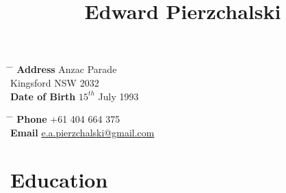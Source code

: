 \documentclass[10pt]{article} %
\begin{document}

\title{Edward Pierzchalski} %


\parbox{0.5\textwidth}{ %
\begin{tabbing} %
\hspace{3cm} \= \hspace{4cm} \= \kill %
{\bf Address}  Anzac Parade\\ %
\> Kingsford NSW 2032 \\ %
{\bf Date of Birth} \> $15^{th}$ July 1993 \\ %
\end{tabbing}}
\hfill %
\parbox{0.5\textwidth}{ %
\begin{tabbing} %
\hspace{3cm} \= \hspace{4cm} \= \kill %
{\bf Phone} \> +61 404 664 375 \\
{\bf Email} \> \href{mailto:e.a.pierzchalski@gmail.com}{e.a.pierzchalski@gmail.com}
\end{tabbing}}


\section{Education}
\end{document}
